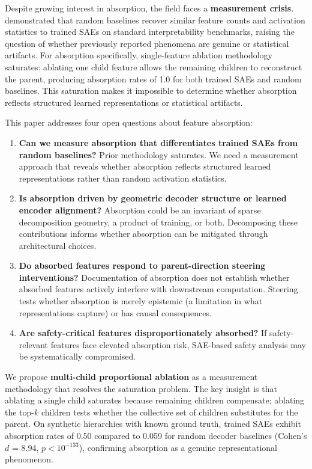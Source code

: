 \documentclass{article}
\begin{document}
Despite growing interest in absorption, the field faces a \textbf{measurement crisis}. \citet{korznikov2026} demonstrated that random baselines recover similar feature counts and activation statistics to trained SAEs on standard interpretability benchmarks, raising the question of whether previously reported phenomena are genuine or statistical artifacts. For absorption specifically, single-feature ablation methodology saturates: ablating one child feature allows the remaining children to reconstruct the parent, producing absorption rates of 1.0 for both trained SAEs and random baselines. This saturation makes it impossible to determine whether absorption reflects structured learned representations or statistical artifacts.

This paper addresses four open questions about feature absorption:

\begin{enumerate}
\item \textbf{Can we measure absorption that differentiates trained SAEs from random baselines?} Prior methodology saturates. We need a measurement approach that reveals whether absorption reflects structured learned representations rather than random activation statistics.

\item \textbf{Is absorption driven by geometric decoder structure or learned encoder alignment?} Absorption could be an invariant of sparse decomposition geometry, a product of training, or both. Decomposing these contributions informs whether absorption can be mitigated through architectural choices.

\item \textbf{Do absorbed features respond to parent-direction steering interventions?} Documentation of absorption does not establish whether absorbed features actively interfere with downstream computation. Steering tests whether absorption is merely epistemic (a limitation in what representations capture) or has causal consequences.

\item \textbf{Are safety-critical features disproportionately absorbed?} If safety-relevant features face elevated absorption risk, SAE-based safety analysis may be systematically compromised.
\end{enumerate}

We propose \textbf{multi-child proportional ablation} as a measurement methodology that resolves the saturation problem. The key insight is that ablating a single child saturates because remaining children compensate; ablating the top-$k$ children tests whether the collective set of children substitutes for the parent. On synthetic hierarchies with known ground truth, trained SAEs exhibit absorption rates of 0.50 compared to 0.059 for random decoder baselines (Cohen's $d$ = 8.94, $p < 10^{-133}$), confirming absorption as a genuine representational phenomenon.
\end{document}
